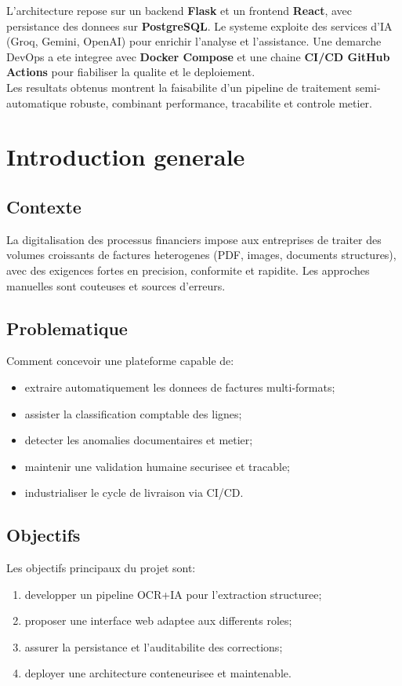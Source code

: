 \documentclass[12pt,a4paper]{report}
\begin{document}
L'architecture repose sur un backend \textbf{Flask} et un frontend \textbf{React}, avec persistance des donnees sur \textbf{PostgreSQL}. Le systeme exploite des services d'IA (Groq, Gemini, OpenAI) pour enrichir l'analyse et l'assistance. Une demarche DevOps a ete integree avec \textbf{Docker Compose} et une chaine \textbf{CI/CD GitHub Actions} pour fiabiliser la qualite et le deploiement. \\

Les resultats obtenus montrent la faisabilite d'un pipeline de traitement semi-automatique robuste, combinant performance, tracabilite et controle metier.

\tableofcontents
\listoffigures
\listoftables

\chapter{Introduction generale}
\section{Contexte}
La digitalisation des processus financiers impose aux entreprises de traiter des volumes croissants de factures heterogenes (PDF, images, documents structures), avec des exigences fortes en precision, conformite et rapidite. Les approches manuelles sont couteuses et sources d'erreurs.

\section{Problematique}
Comment concevoir une plateforme capable de:
\begin{itemize}
    \item extraire automatiquement les donnees de factures multi-formats;
    \item assister la classification comptable des lignes;
    \item detecter les anomalies documentaires et metier;
    \item maintenir une validation humaine securisee et tracable;
    \item industrialiser le cycle de livraison via CI/CD.
\end{itemize}

\section{Objectifs}
Les objectifs principaux du projet sont:
\begin{enumerate}
    \item developper un pipeline OCR+IA pour l'extraction structuree;
    \item proposer une interface web adaptee aux differents roles;
    \item assurer la persistance et l'auditabilite des corrections;
    \item deployer une architecture conteneurisee et maintenable.
\end{enumerate}
\end{document}
